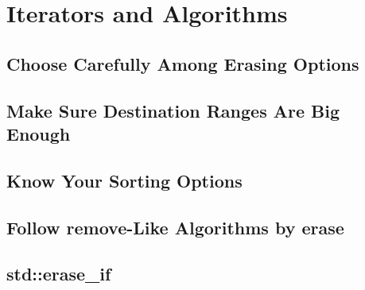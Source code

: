 \section{Iterators and Algorithms}\label{sec:algorithms}

\subsection{Choose Carefully Among Erasing Options}

\subsection{Make Sure Destination Ranges Are Big Enough}

\subsection{Know Your Sorting Options}

\subsection{Follow remove-Like Algorithms by erase}

\subsection{std::erase\_if}
